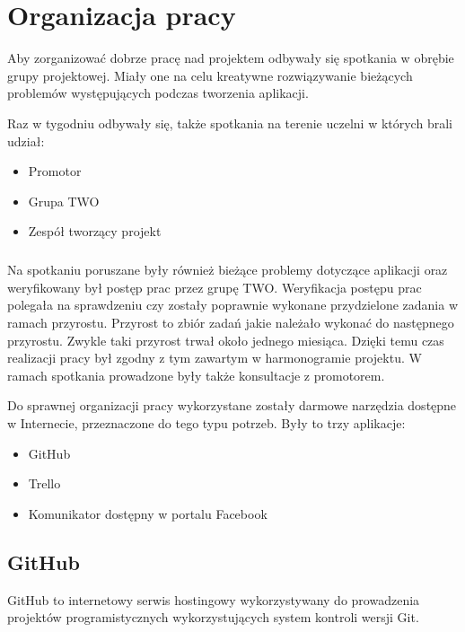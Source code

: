 \chapter{Organizacja pracy}



Aby zorganizować dobrze pracę nad projektem odbywały się spotkania w obrębie grupy projektowej. Miały one na celu kreatywne rozwiązywanie bieżących problemów występujących podczas tworzenia aplikacji. 

Raz w tygodniu odbywały się, także spotkania na terenie uczelni w których brali udział:
\begin{itemize}
\item Promotor
\item Grupa TWO
\item Zespół tworzący projekt
\end{itemize}

\paragraph{}
Na spotkaniu poruszane były również bieżące problemy dotyczące aplikacji oraz weryfikowany był postęp prac przez grupę TWO. Weryfikacja postępu prac polegała na sprawdzeniu czy zostały poprawnie wykonane przydzielone zadania w ramach przyrostu. Przyrost to zbiór zadań jakie należało wykonać do następnego przyrostu. Zwykle taki przyrost trwał około jednego miesiąca. Dzięki temu czas realizacji pracy był zgodny z tym zawartym w harmonogramie projektu. W ramach spotkania prowadzone były także konsultacje z promotorem.

Do sprawnej organizacji pracy wykorzystane zostały darmowe narzędzia dostępne w Internecie, przeznaczone do tego typu potrzeb. Były to trzy aplikacje:
\begin{itemize}
\item GitHub
\item Trello
\item Komunikator dostępny w portalu Facebook
\end{itemize}

\section{GitHub}
GitHub to internetowy serwis hostingowy wykorzystywany do prowadzenia projektów programistycznych wykorzystujących system kontroli wersji Git. 

